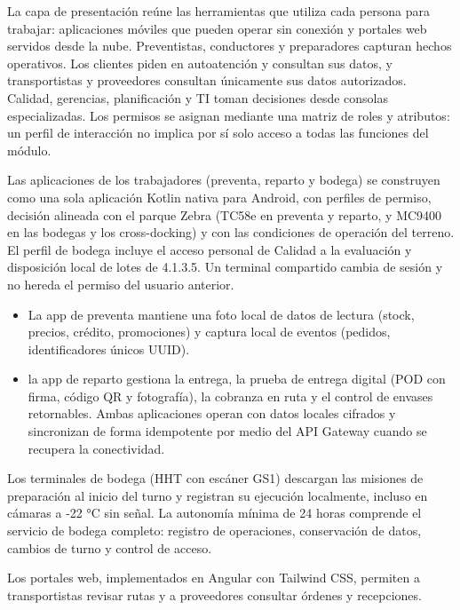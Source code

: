 La capa de presentación reúne las herramientas que utiliza cada persona para trabajar: aplicaciones móviles que pueden operar sin conexión y portales web servidos desde la nube. Preventistas, conductores y preparadores capturan hechos operativos. Los clientes piden en autoatención y consultan sus datos, y transportistas y proveedores consultan únicamente sus datos autorizados. Calidad, gerencias, planificación y TI toman decisiones desde consolas especializadas. Los permisos se asignan mediante una matriz de roles y atributos: un perfil de interacción no implica por sí solo acceso a todas las funciones del módulo.

Las aplicaciones de los trabajadores (preventa, reparto y bodega) se construyen como una sola aplicación Kotlin nativa para Android, con perfiles de permiso, decisión alineada con el parque Zebra (TC58e en preventa y reparto, y MC9400 en las bodegas y los cross-docking) y con las condiciones de operación del terreno. El perfil de bodega incluye el acceso personal de Calidad a la evaluación y disposición local de lotes de 4.1.3.5. Un terminal compartido cambia de sesión y no hereda el permiso del usuario anterior.

\begin{itemize}
  \item La app de preventa mantiene una foto local de datos de lectura (stock, precios, crédito, promociones) y captura local de eventos (pedidos, identificadores únicos UUID).
  \item la app de reparto gestiona la entrega, la prueba de entrega digital (POD con firma, código QR y fotografía), la cobranza en ruta y el control de envases retornables. Ambas aplicaciones operan con datos locales cifrados y sincronizan de forma idempotente por medio del API Gateway cuando se recupera la conectividad.
\end{itemize}

Los terminales de bodega (HHT con escáner GS1) descargan las misiones de preparación al inicio del turno y registran su ejecución localmente, incluso en cámaras a -22 °C sin señal. La autonomía mínima de 24 horas comprende el servicio de bodega completo: registro de operaciones, conservación de datos, cambios de turno y control de acceso.

Los portales web, implementados en Angular con Tailwind CSS, permiten a transportistas revisar rutas y a proveedores consultar órdenes y recepciones.


